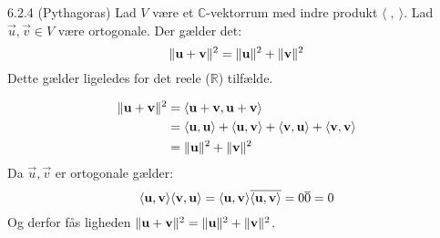\begin{proposition}{6.2.4 (Pythagoras)}
	Lad $V$ være et $\mathbb{C}$-vektorrum med indre produkt 
	$\langle\;,\:\rangle$. Lad $\vec{u}, \vec{v} \in V$ være ortogonale. 
	Der gælder det:
	\[
		\lVert\mathbf{u} + \mathbf{v}\rVert^2 = \lVert\mathbf{u}\rVert^2 + \lVert\mathbf{v}\rVert^2
	\]
	Dette gælder ligeledes for det reele ($\mathbb{R}$) tilfælde.
\end{proposition}

\begin{bevis}
	\begin{align*}
		\lVert\mathbf{u} + \mathbf{v}\rVert^2 &= \langle\mathbf{u} + \mathbf{v}, \mathbf{u} + 
		\mathbf{v}\rangle \\
		&= \langle\mathbf{u},\mathbf{u}\rangle + \langle\mathbf{u},\mathbf{v}\rangle +
		\langle\mathbf{v},\mathbf{u}\rangle + \langle\mathbf{v},\mathbf{v}\rangle \\
		&= \lVert\mathbf{u}\rVert^2 + \lVert\mathbf{v}\rVert^2
	\end{align*}
	Da $\vec{u}, \vec{v}$ er ortogonale gælder:
	\[
		\langle\mathbf{u},\mathbf{v}\rangle \langle\mathbf{v},\mathbf{u}\rangle = 
		\langle\mathbf{u},\mathbf{v}\rangle \overline{\langle\mathbf{u},\mathbf{v}\rangle} = 
		0\overline{0} = 0
	\]
	Og derfor fås ligheden $\lVert\mathbf{u} + \mathbf{v}\rVert^2 = \lVert\mathbf{u}\rVert^2 + 
	\lVert\mathbf{v}\rVert^2$.
\end{bevis}
